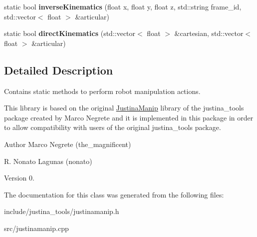 \begin{DoxyCompactItemize}
\item 
static bool {\bfseries inverse\+Kinematics} (float x, float y, float z, std\+::string frame\+\_\+id, std\+::vector$<$ float $>$ \&articular)\hypertarget{class_justina_manip_ac994c510eb23542c4c2630e5aa921dc6}{}\label{class_justina_manip_ac994c510eb23542c4c2630e5aa921dc6}

\item 
static bool {\bfseries direct\+Kinematics} (std\+::vector$<$ float $>$ \&cartesian, std\+::vector$<$ float $>$ \&articular)\hypertarget{class_justina_manip_ad398969ad0a2b8affe2eb78b72777097}{}\label{class_justina_manip_ad398969ad0a2b8affe2eb78b72777097}

\end{DoxyCompactItemize}


\subsection{Detailed Description}
Contains static methods to perform robot manipulation actions. 

This library is based on the original \hyperlink{class_justina_manip}{Justina\+Manip} library of the justina\+\_\+tools package created by Marco Negrete and it is implemented in this package in order to allow compatibility with users of the original justina\+\_\+tools package.

\begin{DoxyAuthor}{Author}
Marco Negrete (the\+\_\+magnificent) 

R. Nonato Lagunas (nonato) 
\end{DoxyAuthor}
\begin{DoxyVersion}{Version}
0. 
\end{DoxyVersion}


The documentation for this class was generated from the following files\+:\begin{DoxyCompactItemize}
\item 
include/justina\+\_\+tools/justinamanip.\+h\item 
src/justinamanip.\+cpp\end{DoxyCompactItemize}
